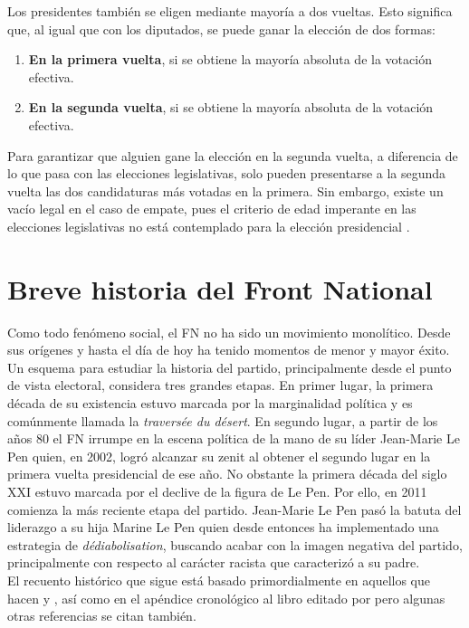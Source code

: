 Los presidentes también se eligen mediante mayoría a dos vueltas. Esto significa que, al igual que con los diputados, se puede ganar la elección de dos formas: 

\begin{enumerate}
\item \textbf{En la primera vuelta}, si se obtiene la mayoría absoluta de la votación efectiva.  
\item \textbf{En la segunda vuelta}, si se obtiene la mayoría absoluta de la votación efectiva. 
\end{enumerate}

Para garantizar que alguien gane la elección en la segunda vuelta, a diferencia de lo que pasa con las elecciones legislativas, solo pueden presentarse a la segunda vuelta las dos candidaturas más votadas en la primera. Sin embargo, existe un vacío legal en el caso de empate, pues el criterio de edad imperante en las elecciones legislativas no está contemplado para la elección presidencial \parencite{Parisien16}.

\section{Breve historia del Front National}

Como todo fenómeno social, el FN no ha sido un movimiento monolítico. Desde sus orígenes y hasta el día de hoy ha tenido momentos de menor y mayor éxito. Un esquema para estudiar la historia del partido, principalmente desde el punto de vista electoral, considera tres grandes etapas. En primer lugar, la primera década de su existencia estuvo marcada por la marginalidad política y es comúnmente llamada la \textit{traversée du désert}. En segundo lugar, a partir de los años 80 el FN irrumpe en la escena política de la mano de su líder Jean-Marie Le Pen quien, en 2002, logró alcanzar su zenit al obtener el segundo lugar en la primera vuelta presidencial de ese año. No obstante la primera década del siglo XXI estuvo marcada por el declive de la figura de Le Pen. Por ello, en 2011 comienza la más reciente etapa del partido. Jean-Marie Le Pen pasó la batuta del liderazgo a su hija Marine Le Pen quien desde entonces ha implementado una estrategia de \textit{dédiabolisation}, buscando acabar con la imagen negativa del partido, principalmente con respecto al carácter racista que caracterizó a su padre.\\ 

El recuento histórico que sigue está basado primordialmente en aquellos que hacen \textcite{Hainsworth16b} y \textcite{Stockemer17}, así como en el apéndice cronológico al libro editado por \textcite{CreponEtAl15} pero algunas otras referencias se citan también.

